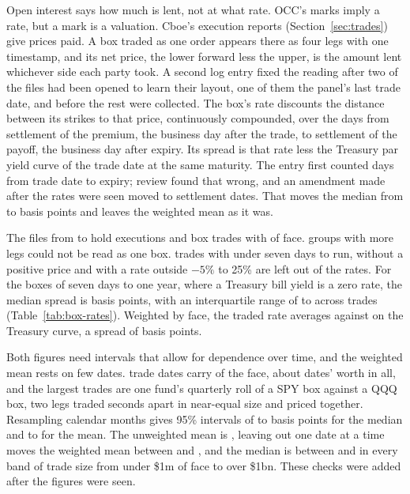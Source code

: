 \documentclass[11pt]{article}
\begin{document}
Open interest says how much is lent, not at what rate. OCC's marks imply a rate, but a
mark is a valuation. Cboe's execution reports (Section~\ref{sec:trades}) give prices
paid. A box traded as one order appears there as four legs with one timestamp, and its
net price, the lower forward less the upper, is the amount lent whichever side each
party took. A second log entry fixed the reading after two of the files had been opened
to learn their layout, one of them the panel's last trade date, and before the rest were
collected. The box's rate discounts the distance between its strikes to that price,
continuously compounded, over the days from settlement of the premium, the business day
after the trade, to settlement of the payoff, the business day after expiry. Its spread
is that rate less the Treasury par yield curve of the trade date at the same maturity.
The entry first counted days from trade date to expiry; review found that wrong, and an
amendment made after the rates were seen moved to settlement dates. That moves the
median from \BoxRTradeDateMedian{} to \BoxRSpreadMedian{} basis points and leaves the
weighted mean as it was.



The \BoxRFiles{} files from \BoxRFirstDate{} to \BoxRLastDate{} hold \BoxRExecutions{}
executions and \BoxRTrades{} box trades with \BoxRFace{} of face. \BoxRUnresolved{}
groups with more legs could not be read as one box. \BoxRDroppedShort{} trades with
under seven days to run, \BoxRDroppedPrice{} without a positive price and
\BoxRDroppedRange{} with a rate outside $-5\%$ to 25\% are left out of the rates. For the
\BoxRHeadlineTrades{} boxes of seven days to one year, where a Treasury bill yield is a
zero rate, the median spread is \BoxRSpreadMedian{} basis points, with an interquartile
range of \BoxRSpreadLow{} to \BoxRSpreadHigh{} across trades (Table~\ref{tab:box-rates}).
Weighted by face, the traded rate averages \BoxRRate{} against \BoxRBenchmark{} on the
Treasury curve, a spread of \BoxRSpread{} basis points.

Both figures need intervals that allow for dependence over time, and the weighted mean
rests on few dates. \BoxRTopDates{} trade dates carry \BoxRTopDatesShare{} of the face,
about \BoxREffectiveDates{} dates' worth in all, and the largest trades are one fund's
quarterly roll of a SPY box against a QQQ box, two legs traded seconds apart in
near-equal size and priced together. Resampling calendar months gives 95\% intervals of
\BoxRMedianLow{} to \BoxRMedianHigh{} basis points for the median and \BoxRMeanLow{} to
\BoxRMeanHigh{} for the mean. The unweighted mean is \BoxRUnweighted{}, leaving out one
date at a time moves the weighted mean between \BoxRLeaveOneLow{} and \BoxRLeaveOneHigh{},
and the median is between \BoxRSizeMedianLow{} and \BoxRSizeMedianHigh{} in every band of
trade size from under \$1m of face to over \$1bn. These checks were added after the
figures were seen.
\end{document}
